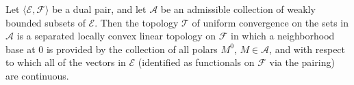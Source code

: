 Let $\langle \mathcal{E}, \mathcal{F} \rangle$ be a dual pair, and let $\mathcal{A}$ be an admissible collection of weakly bounded subsets of $\mathcal{E}$. Then the topology $\mathcal{T}$ of uniform convergence on the sets in $\mathcal{A}$ is a separated locally convex linear topology on $\mathcal{F}$ in which a neighborhood base at $0$ is provided by the collection of all polars $M^0$, $M \in \mathcal{A}$, and with respect to which all of the vectors in $\mathcal{E}$ (identified as functionals on $\mathcal{F}$ via the pairing) are continuous.
